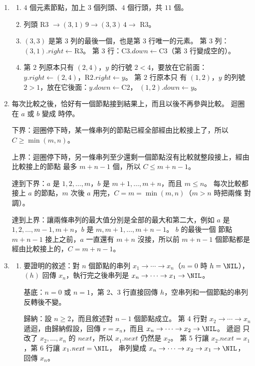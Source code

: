 \begin{enumerate}
\item
\begin{enumerate}
\item $4$ 個元素節點，加上 $3$ 個列頭、$4$ 個行頭，共 $11$ 個。
\item 列頭 R3 $\to (3,1)\,9 \to (3,3)\,4 \to$ R3。
\item $(3,3)$ 是第 $3$ 列的最後一個，也是第 $3$ 行唯一的元素。 第 $3$ 列：
$(3,1).\mathit{right} \gets \text{R3}$。 第 $3$ 行：$\text{C3}.\mathit{down} \gets
\text{C3}$（第 $3$ 行變成空的）。
\item 第 $2$ 列原本只有 $(2,4)$，$y$ 的行號 $2 < 4$，要放在它前面：
$y.\mathit{right} \gets (2,4)$，$\text{R2}.\mathit{right} \gets y$。 第 $2$ 行原本只
有 $(1,2)$，$y$ 的列號 $2 > 1$，放在它後面：$y.\mathit{down} \gets \text{C2}$，
$(1,2).\mathit{down} \gets y$。
\end{enumerate}

\item 每次比較之後，恰好有一個節點接到結果上，而且以後不再參與比較。 迴圈在 $a$ 或
$b$ 變成 \NIL 時停。

下界：迴圈停下時，某一條串列的節點已經全部經由比較接上了，所以 $C \ge \min(m, n)$。

上界：迴圈停下時，另一條串列至少還剩一個節點沒有比較就整段接上，經由比較接上的節點
最多 $m + n - 1$ 個，所以 $C \le m + n - 1$。

達到下界：$a$ 是 $1, 2, \ldots, m$，$b$ 是 $m + 1, \ldots, m + n$，而且 $m \le n$。
每次比較都接上 $a$ 的節點，$m$ 次後 $a$ 用完，$C = m = \min(m, n)$（$m > n$ 時把兩條
對調）。

達到上界：讓兩條串列的最大值分別是全部的最大和第二大，例如 $a$ 是
$1, 2, \ldots, m - 1, m + n$，$b$ 是 $m, m + 1, \ldots, m + n - 1$。 $b$ 的最後一個
節點 $m + n - 1$ 接上之前，$a$ 一直還有 $m + n$ 沒接，所以前 $m + n - 1$ 個節點都是
經由比較接上的，$C = m + n - 1$。

\item
\begin{enumerate}
\item 要證明的敘述：對 $n$ 個節點的串列 $x_1 \to \cdots \to x_n$（$n = 0$ 時 $h =
\NIL$），$(h)$ 回傳 $x_n$，執行完之後串列是 $x_n \to \cdots \to x_1 \to
\NIL$。

基底：$n = 0$ 或 $n = 1$，第 2、3 行直接回傳 $h$，空串列和一個節點的串列反轉後不變。

歸納：設 $n \ge 2$，而且敘述對 $n - 1$ 個節點成立。 第 4 行對 $x_2 \to \cdots \to
x_n$ 遞迴，由歸納假設，回傳 $r = x_n$，而且 $x_n \to \cdots \to x_2 \to \NIL$。 遞迴
只改了 $x_2, \ldots, x_n$ 的 $\mathit{next}$，所以 $x_1.\mathit{next}$ 仍然是
$x_2$。 第 5 行讓 $x_2.\mathit{next} = x_1$，第 6 行讓 $x_1.\mathit{next} = \NIL$，
串列變成 $x_n \to \cdots \to x_2 \to x_1 \to \NIL$，回傳 $x_n$。


\end{enumerate}
\end{enumerate}
